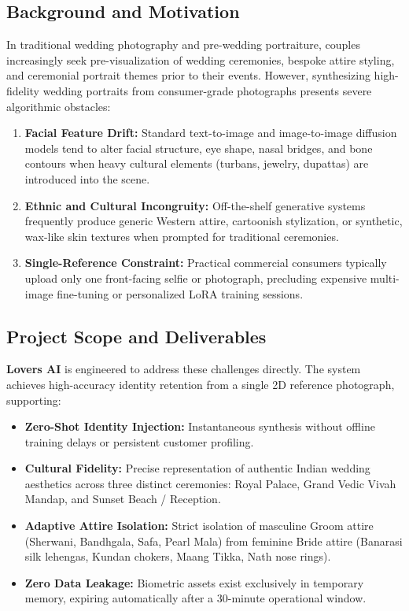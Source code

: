 \documentclass[11pt,a4paper]{article}
\begin{document}
\subsection{Background and Motivation}
In traditional wedding photography and pre-wedding portraiture, couples increasingly seek pre-visualization of wedding ceremonies, bespoke attire styling, and ceremonial portrait themes prior to their events. However, synthesizing high-fidelity wedding portraits from consumer-grade photographs presents severe algorithmic obstacles:
\begin{enumerate}[leftmargin=*]
    \item \textbf{Facial Feature Drift:} Standard text-to-image and image-to-image diffusion models tend to alter facial structure, eye shape, nasal bridges, and bone contours when heavy cultural elements (turbans, jewelry, dupattas) are introduced into the scene.
    \item \textbf{Ethnic and Cultural Incongruity:} Off-the-shelf generative systems frequently produce generic Western attire, cartoonish stylization, or synthetic, wax-like skin textures when prompted for traditional ceremonies.
    \item \textbf{Single-Reference Constraint:} Practical commercial consumers typically upload only one front-facing selfie or photograph, precluding expensive multi-image fine-tuning or personalized LoRA training sessions.
\end{enumerate}

\subsection{Project Scope and Deliverables}
\textbf{Lovers AI} is engineered to address these challenges directly. The system achieves high-accuracy identity retention from a single 2D reference photograph, supporting:
\begin{itemize}[leftmargin=*]
    \item \textbf{Zero-Shot Identity Injection:} Instantaneous synthesis without offline training delays or persistent customer profiling.
    \item \textbf{Cultural Fidelity:} Precise representation of authentic Indian wedding aesthetics across three distinct ceremonies: Royal Palace, Grand Vedic Vivah Mandap, and Sunset Beach / Reception.
    \item \textbf{Adaptive Attire Isolation:} Strict isolation of masculine Groom attire (Sherwani, Bandhgala, Safa, Pearl Mala) from feminine Bride attire (Banarasi silk lehengas, Kundan chokers, Maang Tikka, Nath nose rings).
    \item \textbf{Zero Data Leakage:} Biometric assets exist exclusively in temporary memory, expiring automatically after a 30-minute operational window.
\end{itemize}
\end{document}
